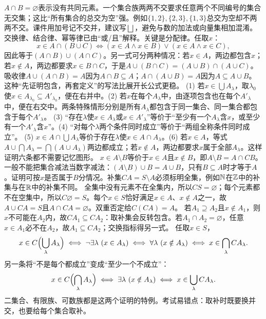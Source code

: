 $A\cap B=\varnothing$表示没有共同元素。一个集合族两两不交要求任意两个不同编号的集合无交集；这比“所有集合的总交为空”强。例如$\{1,2\},\{2,3\},\{1,3\}$总交为空却不两两不交。课件用加号记不交并，建议写$\bigsqcup$，避免与数的加法或向量集相加混淆。
交换律、结合律、幂等律已由“或/且”解释。关键是分配律。任取$x$：
\[x\in A\cap(B\cup C)\iff(x\in A\land x\in B)\lor(x\in A\land x\in C),\]
因此等于$(A\cap B)\cup(A\cap C)$。另一式可分两种情况：若$x\in A$，两边都包含$x$；若$x\notin A$，两边都要求$x\in B\cap C$，于是$A\cup(B\cap C)=(A\cup B)\cap(A\cup C)$。
吸收律$A\cup(A\cap B)=A$因为$A\cap B\subseteq A$；$A\cap(A\cup B)=A$因为$A\subseteq A\cup B$。这种“先证明包含，再套定义”的写法比展开长公式更稳。
(1) 若$x\in\bigcup A_\lambda$，取$\lambda_0$使$x\in A_{\lambda_0}\subseteq A'_{\lambda_0}$，便在右并中。(2) 若$x$在每个$A_\lambda$中，由逐项包含也在每个$A'_\lambda$中，便在右交中。两条特殊情形分别是所有$A_\lambda$都包含于同一集合、同一集合都包含于每个$A'_\lambda$。
(3) “存在$\lambda$使$x\in A_\lambda$或$x\in A'_\lambda$”等价于“至少有一个$A_\lambda$含$x$，或至少有一个$A'_\lambda$含$x$”。(4) “对每个$\lambda$两个条件同时成立”等价于“两组全称条件同时成立”。
(5) $x\in A\cap\bigcup A_\lambda$等价于存在$\lambda$使$x\in A\cap A_\lambda$。(6) 若$x\in A$，等式$A\cup\bigcap A_\lambda=\bigcap(A\cup A_\lambda)$两边都成立；若$x\notin A$，两边都要求$x$属于全部$A_\lambda$。这样证明六条都不需要记忆图形。
$x\in A\setminus B$等价于$x\in A$且$x\notin B$，即$A\setminus B=A\cap CB$。一般不能把集合减法当数字减法：$(A\setminus B)\cup B=A\cup B$，只有$B\subseteq A$时才等于$A$。证明可按$x$是否属于$B$分情况。补集$CA=S\setminus A$必须标明全集，例如$\mathbb{N}$在$\mathbb{Z}$中的补集与在$\mathbb{R}$中的补集不同。
全集中没有元素不在全集内，所以$CS=\varnothing$；每个元素都不在空集中，所以$C\varnothing=S$。每个$x\in S$恰好满足$x\in A$、$x\notin A$之一，故$A\cup CA=S$且$A\cap CA=\varnothing$。双重否定给$C(CA)=A$。
若$A_1\supseteq A_2$且$x\notin A_1$，则$x$不可能在$A_2$内，故$CA_1\subseteq CA_2$：取补集会反转包含。若$A_1\cap A_2=\varnothing$，任意$x\in A_1$必不在$A_2$，故$A_1\subseteq CA_2$；交换指标得另一式。
任取$x\in S$，
\[x\in C\Bigl(\bigcup_\lambda A_\lambda\Bigr)\iff\neg\exists\lambda\ (x\in A_\lambda)\iff\forall\lambda\ (x\notin A_\lambda)\iff x\in\bigcap_\lambda CA_\lambda.\]
另一条将“不是每个都成立”变成“至少一个不成立”：
\[x\in C\Bigl(\bigcap_\lambda A_\lambda\Bigr)\iff\exists\lambda\ (x\notin A_\lambda)\iff x\in\bigcup_\lambda CA_\lambda.\]
二集合、有限族、可数族都是这两个证明的特例。考试易错点：取补时既要换并交，也要给每个集合取补。
